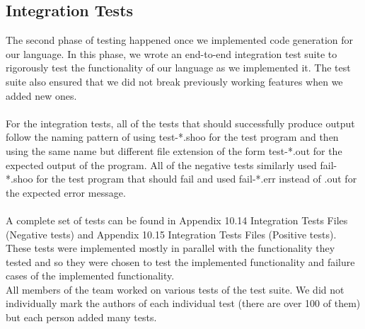\documentclass[12pt]{article}
\begin{document}
\subsection{Integration Tests}
The second phase of testing happened once we implemented code generation for our language. In this phase, we wrote an end-to-end integration test suite to rigorously test the functionality of our language as we implemented it. The test suite also ensured that we did not break previously working features when we added new ones. \\
\\
For the integration tests, all of the tests that should successfully produce output follow the naming pattern of using test-*.shoo for the test program and then using the same name but different file extension of the form test-*.out for the expected output of the program. All of the negative tests similarly used fail-*.shoo for the test program that should fail and used fail-*.err instead of .out for the expected error message. \\
\\
A complete set of tests can be found in Appendix 10.14 Integration Tests Files (Negative tests) and Appendix 10.15 Integration Tests Files (Positive tests).\\
These tests were implemented mostly in parallel with the functionality they tested and so they were chosen to test the implemented functionality and failure cases of the implemented functionality.
\\
All members of the team worked on various tests of the test suite. We did not individually mark the authors of each individual test (there are over 100 of them) but each person added many tests.
\end{document}
